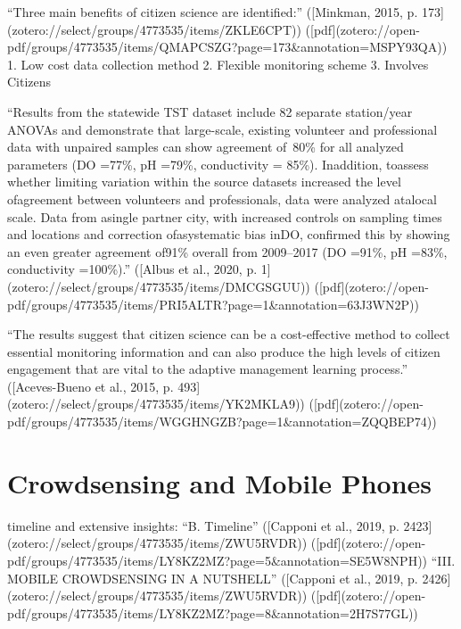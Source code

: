 “Three main benefits of citizen science are identified:” ([Minkman, 2015, p. 173](zotero://select/groups/4773535/items/ZKLE6CPT)) ([pdf](zotero://open-pdf/groups/4773535/items/QMAPCSZG?page=173&annotation=MSPY93QA))
1. Low cost data collection method
2. Flexible monitoring scheme
3. Involves Citizens



“Results from the statewide TST dataset include 82 separate station/year ANOVAs and demonstrate that large-scale, existing volunteer and professional data with unpaired samples can show agreement of~80\% for all analyzed parameters (DO =77\%, pH =79\%, conductivity = 85\%). Inaddition, toassess whether limiting variation within the source datasets increased the level ofagreement between volunteers and professionals, data were analyzed atalocal scale. Data from asingle partner city, with increased controls on sampling times and locations and correction ofasystematic bias inDO, confirmed this by showing an even greater agreement of91\% overall from 2009–2017 (DO =91\%, pH =83\%, conductivity =100\%).” ([Albus et al., 2020, p. 1](zotero://select/groups/4773535/items/DMCGSGUU)) ([pdf](zotero://open-pdf/groups/4773535/items/PRI5ALTR?page=1\&annotation=63J3WN2P))

“The results suggest that citizen science can be a cost-effective method to collect essential monitoring information and can also produce the high levels of citizen engagement that are vital to the adaptive management learning process.” ([Aceves-Bueno et al., 2015, p. 493](zotero://select/groups/4773535/items/YK2MKLA9)) ([pdf](zotero://open-pdf/groups/4773535/items/WGGHNGZB?page=1&annotation=ZQQBEP74))





\section{Crowdsensing and Mobile Phones}
timeline and extensive insights:
“B. Timeline” ([Capponi et al., 2019, p. 2423](zotero://select/groups/4773535/items/ZWU5RVDR)) ([pdf](zotero://open-pdf/groups/4773535/items/LY8KZ2MZ?page=5&annotation=SE5W8NPH))
“III. MOBILE CROWDSENSING IN A NUTSHELL” ([Capponi et al., 2019, p. 2426](zotero://select/groups/4773535/items/ZWU5RVDR)) ([pdf](zotero://open-pdf/groups/4773535/items/LY8KZ2MZ?page=8&annotation=2H7S77GL))

